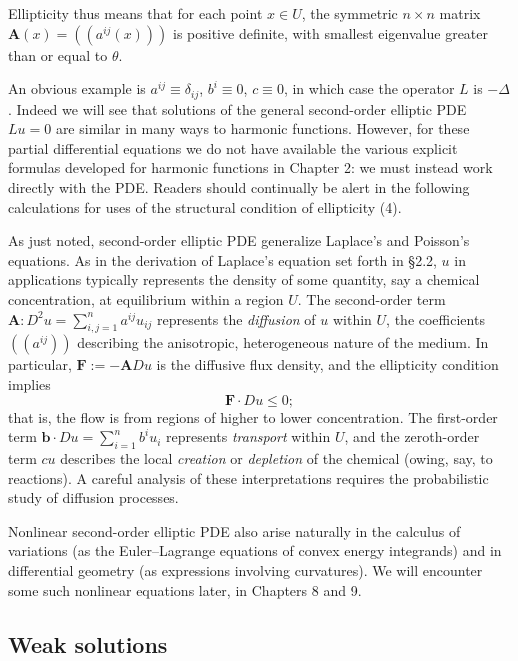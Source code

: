 Ellipticity thus means that for each point $x \in U$, the symmetric $n \times n$ matrix $\mathbf A(x) = ((a^{ij}(x)))$ is positive definite, with smallest eigenvalue greater than or equal to $\theta$.

An obvious example is $a^{ij} \equiv \delta_{ij}$, $b^i \equiv 0$, $c \equiv 0$, in which case the operator $L$ is $-\Delta$. Indeed we will see that solutions of the general second-order elliptic PDE $Lu = 0$ are similar in many ways to harmonic functions. However, for these partial differential equations we do not have available the various explicit formulas developed for harmonic functions in Chapter 2: we must instead work directly with the PDE. Readers should continually be alert in the following calculations for uses of the structural condition of ellipticity (4).

\begin{remark}
\label{rem:elliptic-pde-physical-interpretation}
As just noted, second-order elliptic PDE generalize Laplace's and Poisson's equations. As in the derivation of Laplace's equation set forth in \S2.2, $u$ in applications typically represents the density of some quantity, say a chemical concentration, at equilibrium within a region $U$. The second-order term $\mathbf A : D^2u = \sum_{i,j=1}^n a^{ij}u_{ij}$ represents the \textit{diffusion} of $u$ within $U$, the coefficients $((a^{ij}))$ describing the anisotropic, heterogeneous nature of the medium. In particular, $\mathbf F := -\mathbf A Du$ is the diffusive flux density, and the ellipticity condition implies
$$\mathbf F \cdot Du \leq 0;$$
that is, the flow is from regions of higher to lower concentration. The first-order term $\mathbf b \cdot Du = \sum_{i=1}^n b^i u_i$ represents \textit{transport} within $U$, and the zeroth-order term $cu$ describes the local \textit{creation} or \textit{depletion} of the chemical (owing, say, to reactions). A careful analysis of these interpretations requires the probabilistic study of diffusion processes.

Nonlinear second-order elliptic PDE also arise naturally in the calculus of variations (as the Euler--Lagrange equations of convex energy integrands) and in differential geometry (as expressions involving curvatures). We will encounter some such nonlinear equations later, in Chapters 8 and 9.
\end{remark}

\subsection{Weak solutions}

